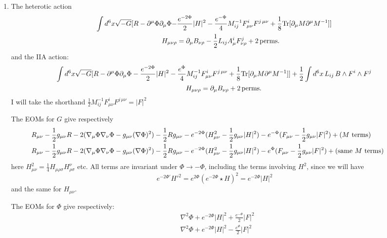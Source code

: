 \documentclass[11pt, class=article, crop=false]{standalone}
\begin{document}
\begin{enumerate}
	\item The heterotic action
	\[
	\begin{aligned}
		\int d^6 x \sqrt{-G} [R - \partial^\mu \Phi \partial_\mu \Phi - &\frac{e^{-2 \Phi}}{2} |H|^2 - \frac{e^{-\Phi}}{4} M^{-1}_{ij} F^i_{\mu \nu} F^{j\, \mu \nu} + \frac18 \mathrm{Tr}[\partial_\mu M \partial^\mu M^{-1}]]\\
		 H_{\mu \nu \rho} &= \partial_\mu B_{\nu \rho} - \frac12 L_{ij} A^i_\mu F^j_{\nu \rho} + 2 \,\mathrm{perms.}
	\end{aligned}
	\]
	and the IIA action:
	\[
	\begin{aligned}
		\int d^6 x \sqrt{-G} [R - \partial^\mu \Phi \partial_\mu \Phi - \frac{e^{-2 \Phi}}{2} |H|^2 - \frac{e^{\Phi}}{4} M^{-1}_{ij}& F^i_{\mu \nu} F^{j\, \mu \nu} + \frac18 \mathrm{Tr}[\partial_\mu M \partial^\mu M^{-1}]] + \frac12 \int d^6 x \, L_{ij}\, B \wedge F^i \wedge F^j
		 \\
		 \quad H_{\mu \nu \rho} &= \partial_\mu B_{\nu \rho} + 2 \,\mathrm{perms.}
	\end{aligned}
	\]
	I will take the shorthand $\frac12 M^{-1}_{ij} F^i_{\mu \nu} F^{j\, \mu \nu} = |F|^2$
	
	
	The EOMs for $G$ give respectively
	\[
	\hspace{-.3in}
		\begin{aligned}
			&R_{\mu \nu} - \frac12 g_{\mu \nu} R - 2 (\nabla_{\mu} \Phi \nabla_\nu \Phi - g_{\mu \nu} (\nabla \Phi)^2 ) - \frac12 R g_{\mu \nu} - e^{-2 \Phi} (H^2_{\mu \nu} - \frac12 g_{\mu \nu} |H|^2) - e^{-\Phi} (F_{\mu \nu}- \frac12 g_{\mu \nu} |F|^2) + (M \text{ terms})\\
			&R_{\mu \nu} - \frac12 g_{\mu \nu} R - 2 (\nabla_{\mu} \Phi \nabla_\nu \Phi - g_{\mu \nu} (\nabla \Phi)^2 ) - \frac12 R g_{\mu \nu} - e^{-2 \Phi} (H^2_{\mu \nu} - \frac12 g_{\mu \nu} |H|^2) - e^{\Phi} (F_{\mu \nu}- \frac12 g_{\mu \nu} |F|^2) + (\text{same } M \text{ terms})\\
		\end{aligned}
	\]
	here $H^2_{\mu \nu} = \frac{1}{4} H_{\mu \rho \sigma} H^{\nu}_{\rho \sigma}$ etc. All terms are invariant under $\Phi \to - \Phi$, including the terms involving $H^2$, since we will have
	\[
		e^{-2\Phi'} {H'}^2 = e^{2 \Phi} (e^{-2\Phi} \star H)^2 = e^{-2 \Phi} |H|^2
	\]
	and the same for $H_{\mu \nu}$.

	The EOMs for $\Phi$ give respectively:
	\[
	\begin{aligned}
		&\nabla^2 \Phi + e^{-2\Phi} |H|^2  + \frac{e^{-\Phi}}{2} |F|^2\\
		&\nabla^2 \Phi + e^{-2\Phi} |H|^2  - \frac{e^{\Phi}}{2} |F|^2
	\end{aligned}
	\]
	

\end{enumerate}
\end{document}
